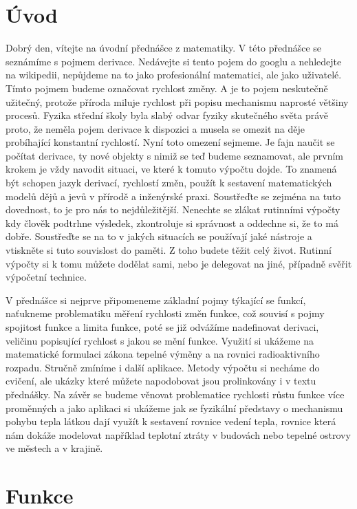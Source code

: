 \documentclass[12pt]{article}
\begin{document}
\section*{Úvod}

Dobrý den, vítejte na úvodní přednášce z matematiky. V této přednášce se seznámíme s pojmem derivace. Nedávejte si tento pojem do googlu a nehledejte na wikipedii, nepůjdeme na to jako profesionální matematici, ale jako uživatelé. Tímto pojmem budeme označovat rychlost změny. A je to pojem neskutečně užitečný, protože příroda miluje rychlost při popisu mechanismu naprosté většiny procesů. Fyzika střední školy byla slabý odvar fyziky skutečného světa právě proto, že neměla pojem derivace k dispozici a musela se omezit na děje probíhající konstantní rychlostí. Nyní toto omezení sejmeme. Je fajn naučit se počítat derivace, ty nové objekty s nimiž se teď budeme seznamovat, ale prvním krokem je vždy navodit situaci, ve které k tomuto výpočtu dojde. To znamená být schopen jazyk derivací, rychlostí změn, použít k sestavení matematických modelů dějů a jevů v přírodě a inženýrské praxi. Soustřeďte se zejména na tuto dovednost, to je pro nás to nejdůležitější. Nenechte se zlákat rutinními výpočty kdy člověk podtrhne výsledek, zkontroluje si správnost a oddechne si, že to má dobře. Soustřeďte se na to v jakých situacích se používají jaké nástroje a vtiskněte si tuto souvislost do paměti. Z toho budete těžit celý život. Rutinní výpočty si k tomu můžete dodělat sami, nebo je delegovat na jiné, případně svěřit výpočetní technice.

V přednášce si nejprve připomeneme základní pojmy týkající se funkcí, naťukneme problematiku měření rychlosti změn funkce, což souvisí s pojmy spojitost funkce  a limita funkce, poté se již odvážíme nadefinovat derivaci, veličinu popisující rychlost s jakou se mění funkce. Využití si ukážeme na matematické formulaci zákona tepelné výměny a na rovnici radioaktivního rozpadu. Stručně zmíníme i další aplikace. Metody výpočtu si necháme do cvičení, ale ukázky které můžete napodobovat jsou prolinkovány i v textu přednášky. Na závěr se budeme věnovat problematice rychlosti růstu funkce více proměnných a jako aplikaci si ukážeme jak se fyzikální představy o mechanismu pohybu tepla látkou dají využít k sestavení rovnice vedení tepla, rovnice která nám dokáže modelovat například teplotní ztráty v budovách nebo tepelné ostrovy ve městech a v krajině. 

\section*{Funkce}
\end{document}
